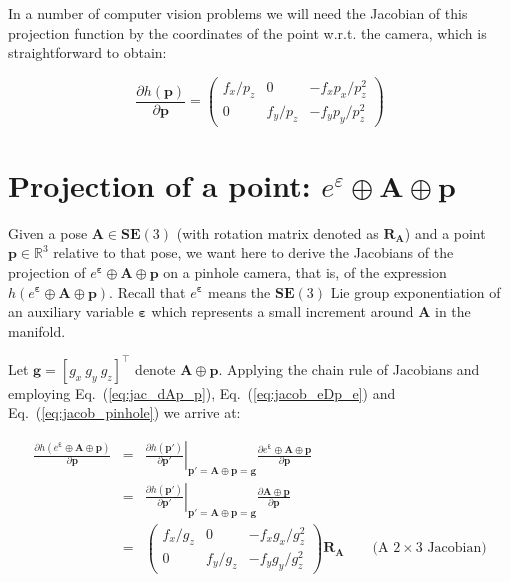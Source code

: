 \documentclass[a4paper,11pt]{report}
\newcommand{\E}{{\bm{\varepsilon}}}
\newcommand{\A}{{\mathbf{A}}}
\begin{document}
In a number of computer vision problems we will need the Jacobian of this
projection function by the coordinates of the point w.r.t. the camera, which
is straightforward to obtain:

\begin{equation}
\label{eq:jacob_pinhole}
\frac{\partial h(\mathbf{p})}{\partial \mathbf{p}} =
\left(
\begin{array}{ccc}
 f_x/p_z  &    0    &  -f_x p_x/p_z^2   \\
 0 & f_y/p_z  &  -f_y p_y/ p_z^2
\end{array}
\right)
\end{equation}


\section{Projection of a point: $e^\varepsilon \oplus \mathbf{A} \oplus \mathbf{p}$}

Given a pose $\mathbf{A} \in \mathbf{SE}(3)$
(with rotation matrix denoted as $\mathbf{R_A}$)
and a point
$\mathbf{p} \in \mathbb{R}^3$
relative to that pose, we want here to derive the Jacobians of
the projection of $e^\E \oplus \A \oplus \mathbf{p}$ on a pinhole camera, that is,
of the expression $h(e^\E \oplus \A \oplus \mathbf{p})$.
Recall that $e^\E$ means the $\mathbf{SE}(3)$ Lie group exponentiation
of an auxiliary variable $\E$ which represents a small increment around $\A$ in the manifold.

Let $\mathbf{g}=[g_x ~ g_y ~ g_z]^\top$ denote $\mathbf{A} \oplus \mathbf{p}$.
Applying the chain rule of Jacobians and employing Eq.~(\ref{eq:jac_dAp_p}),
Eq.~(\ref{eq:jacob_eDp_e})
and  Eq.~(\ref{eq:jacob_pinhole})
we arrive at:

\begin{eqnarray}
\frac{\partial h(e^\E \oplus \A \oplus \mathbf{p})}{\partial \mathbf{p}}
&=&
\left. \frac{\partial h(\mathbf{p'})}{\partial \mathbf{p'}} \right|_{ \mathbf{p'} = \A \oplus \mathbf{p} = \mathbf{g} }
\frac{\partial e^\E \oplus \A \oplus \mathbf{p} }{\partial \mathbf{p}} \\
&=&
\left. \frac{\partial h(\mathbf{p'})}{\partial \mathbf{p'}} \right|_{ \mathbf{p'} = \A \oplus \mathbf{p} = \mathbf{g} }
\frac{\partial \A \oplus \mathbf{p} }{\partial \mathbf{p}} \\
&=&
\left(
\begin{array}{ccc}
 f_x / g_z   &    0    &  -f_x g_x / g_z^2   \\
 0 & f_y / g_z  &  -f_y g_y / g_z^2
\end{array}
\right)
\mathbf{R_A}
\quad\quad \text{(A $2 \times 3$ Jacobian)}
\end{eqnarray}
\end{document}
